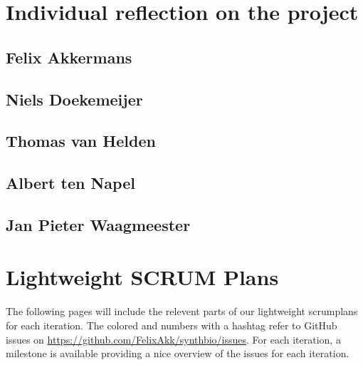 \documentclass[a4paper]{article}
\begin{document}
\section{Individual reflection on the project} %
\subsection{Felix Akkermans}
\subsection{Niels Doekemeijer}
\subsection{Thomas van Helden}
\subsection{Albert ten Napel}
\subsection{Jan Pieter Waagmeester}

\section{Lightweight SCRUM Plans}
The following pages will include the relevent parts of our lightweight scrumplans for each iteration. The colored and numbers with a hashtag refer to GitHub issues on \url{https://github.com/FelixAkk/synthbio/issues}. For each iteration, a milestone is available providing a nice overview of the issues for each iteration.






\end{document}
